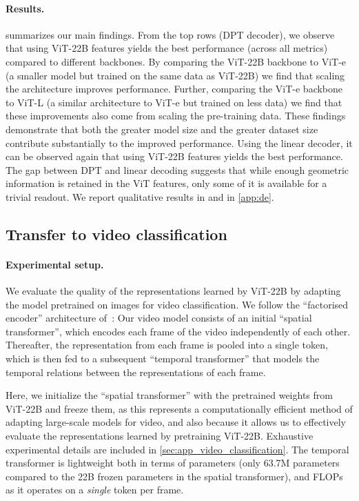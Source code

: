 \documentclass{article}
\newcommand{\chonk}{\mbox{ViT-22B}\xspace}
\begin{document}
\paragraph{Results.}
 summarizes our main findings.
From the top rows (DPT decoder), we observe that using \chonk features yields the best performance (across all metrics) compared to different backbones. By comparing the \chonk backbone to ViT-e (a smaller model but trained on the same data as \chonk) we find that scaling the architecture improves performance. Further, comparing the ViT-e backbone to ViT-L (a similar architecture to ViT-e but trained on less data) we find that these improvements also come from scaling the pre-training data. These findings demonstrate that both the greater model size and the greater dataset size contribute substantially to the improved performance.
Using the linear decoder, it can be observed again that using \chonk features yields the best performance.
The gap between DPT and linear decoding suggests that while enough geometric information is retained in the ViT features, only some of it is available for a trivial readout.
We report qualitative results in  and  in \cref{app:de}.




 

\subsection{Transfer to video classification}
\paragraph{Experimental setup.}
We evaluate the quality of the representations learned by \chonk by adapting the model pretrained on images for video classification.
We follow the ``factorised encoder'' architecture of~\citet{arnab2021vivit}: Our video model consists of an initial ``spatial transformer'', which encodes each frame of the video independently of each other.
Thereafter, the representation from each frame is pooled into a single token, which is then fed to a subsequent ``temporal transformer'' that models the temporal relations between the representations of each frame.

Here, we initialize the ``spatial transformer'' with the pretrained weights from ViT-22B and freeze them, as this represents a computationally efficient method of adapting large-scale models for video, and also because it allows us to effectively evaluate the representations learned by pretraining \chonk. Exhaustive experimental details are included in \cref{sec:app_video_classification}. The temporal transformer is lightweight both in terms of parameters (only 63.7M parameters compared to the 22B frozen parameters in the spatial transformer), and FLOPs as it operates on a \emph{single} token per frame.
\end{document}
